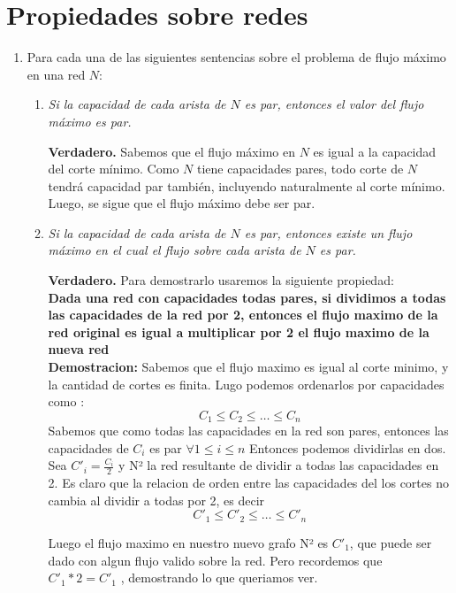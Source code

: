 \documentclass{article}
\begin{document}
\section*{Propiedades sobre redes}

\begin{enumerate}
    \item Para cada una de las siguientes sentencias sobre el problema de flujo máximo en una red \( N \):
    \begin{enumerate}
        \item \textit{Si la capacidad de cada arista de \( N \) es par, entonces el valor del flujo máximo es par.}
        
        \textbf{Verdadero.} Sabemos que el flujo máximo en \( N \) es igual a la capacidad del corte mínimo. Como \( N \) tiene capacidades pares, todo corte de \( N \) tendrá capacidad par también, incluyendo naturalmente al corte mínimo. Luego, se sigue que el flujo máximo debe ser par.
        
        \item \textit{Si la capacidad de cada arista de \( N \) es par, entonces existe un flujo máximo en el cual el flujo sobre cada arista de \( N \) es par.}
        
        \textbf{Verdadero.} 
		Para demostrarlo usaremos la siguiente propiedad: \\
		 
        \textbf{Dada una red con capacidades todas pares, si dividimos a todas las capacidades de la red por 2, entonces el flujo maximo de la red original es igual a multiplicar por 2 el flujo maximo de la nueva red} \\
        
        \textbf{Demostracion:} Sabemos que el flujo maximo es igual al corte minimo, y la cantidad de cortes es finita. Lugo podemos ordenarlos por capacidades como :
        \[ C_1 \le C_2 \le \dots \le C_n\]
         Sabemos que como todas las capacidades en la red son pares, entonces las capacidades de $C_i$ es par $\forall 1 \le i \le n$
         Entonces podemos dividirlas en dos. Sea $C'_i = \frac{C_i}{2}$  y N² la red resultante de dividir a todas las capacidades en 2. Es claro que la relacion de orden entre las capacidades del los cortes no cambia al dividir a todas por 2, es decir
         \[ C'_1 \le C'_2 \le \dots \le C'_n\]
         
         Luego el flujo maximo en nuestro nuevo grafo N² es $C'_1$, que puede ser dado con algun flujo valido sobre la red.
         Pero recordemos que $C'_1*2 = C'_1$ , demostrando lo que queriamos ver.   \\
        

\end{enumerate}
\end{enumerate}
\end{document}
